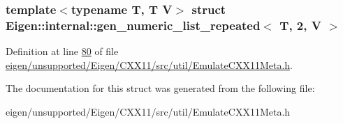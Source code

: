 \subsubsection*{template$<$typename T, T V$>$\newline
struct Eigen\+::internal\+::gen\+\_\+numeric\+\_\+list\+\_\+repeated$<$ T, 2, V $>$}



Definition at line \hyperlink{eigen_2unsupported_2_eigen_2_c_x_x11_2src_2util_2_emulate_c_x_x11_meta_8h_source_l00080}{80} of file \hyperlink{eigen_2unsupported_2_eigen_2_c_x_x11_2src_2util_2_emulate_c_x_x11_meta_8h_source}{eigen/unsupported/\+Eigen/\+C\+X\+X11/src/util/\+Emulate\+C\+X\+X11\+Meta.\+h}.



The documentation for this struct was generated from the following file\+:\begin{DoxyCompactItemize}
\item 
eigen/unsupported/\+Eigen/\+C\+X\+X11/src/util/\+Emulate\+C\+X\+X11\+Meta.\+h\end{DoxyCompactItemize}

